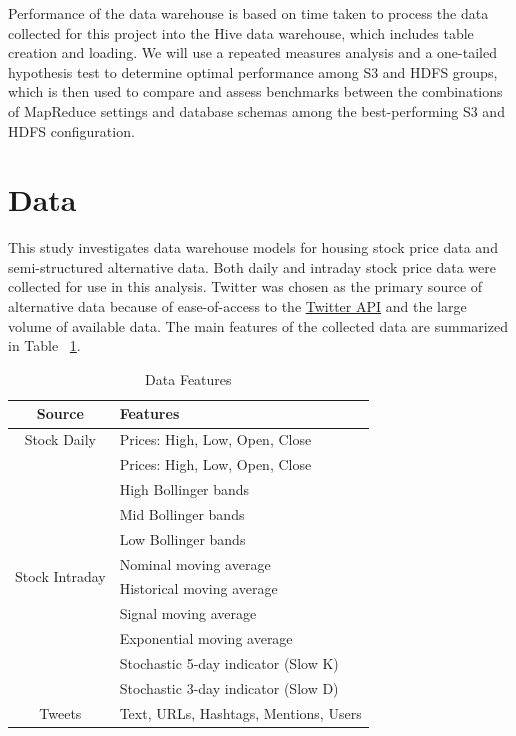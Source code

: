 \documentclass[journal]{IEEEtran}
\begin{document}
Performance of the data warehouse is based on time taken to process the data
collected for this project into the Hive data warehouse,
which includes table creation and loading. 
We will use a repeated measures analysis and a one-tailed hypothesis 
test to determine optimal performance among S3 and HDFS groups, 
which is then used to compare and assess benchmarks between the 
combinations of MapReduce settings and database schemas among the
best-performing S3 and HDFS configuration.

\section{Data}

This study investigates data warehouse models for housing stock
 price data and semi-structured alternative data. 
Both daily and intraday stock price data were collected
 for use in this analysis. 
Twitter was chosen as the primary source of alternative data because of
 ease-of-access to the \href{https://developer.twitter.com/en/docs}{Twitter API} 
 and the large volume of available data.
The main features of the collected data are summarized in Table ~\ref{DataFeatures}.

\begin{table}
    \renewcommand{\arraystretch}{1.3}
    \caption{Data Features}
    \label{DataFeatures}
    \centering
    \begin{tabular}{c|l}
        \hline
        \hline
        Source       & Features\\
        \hline
        Stock Daily  & Prices: High, Low, Open, Close\\
        \hline
        \multirow{10}{*}{Stock Intraday} &  Prices: High, Low, Open, Close \\
        \cline{2-2}
        &  High Bollinger bands\\
        \cline{2-2}
        &  Mid Bollinger bands\\
        \cline{2-2}
        &  Low Bollinger bands\\ 
        \cline{2-2}
        &  Nominal moving average\\
        \cline{2-2}
        &  Historical moving average\\
        \cline{2-2}
        &  Signal moving average\\ 
        \cline{2-2}
        &  Exponential moving average\\
        \cline{2-2}
        &  Stochastic 5-day indicator (Slow K)\\
        \cline{2-2}
        &  Stochastic 3-day indicator (Slow D)\\
        \hline
        Tweets       & Text, URLs, Hashtags, Mentions, Users\\
        \hline
        \hline
    \end{tabular}
\end{table}
\end{document}
